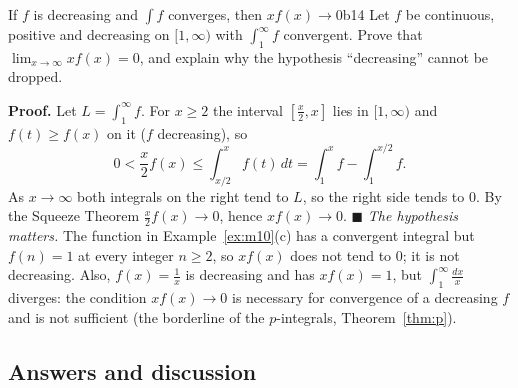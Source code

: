 \documentclass[11pt]{article}
\begin{document}
\begin{exmp}{If $f$ is decreasing and $\int f$ converges, then $xf(x)\to0$}{b14}
Let $f$ be continuous, positive and decreasing on $[1,\infty)$ with $\int_1^\infty f$ convergent. Prove that $\lim_{x\to\infty}xf(x)=0$, and explain why the hypothesis ``decreasing'' cannot be dropped.

\textbf{Proof.} Let $L=\int_1^\infty f$. For $x\ge2$ the interval $\left[\frac x2,x\right]$ lies in $[1,\infty)$ and $f(t)\ge f(x)$ on it ($f$ decreasing), so
\[0<\frac x2f(x)\le\int_{x/2}^xf(t)\,dt=\int_1^xf-\int_1^{x/2}f .\]
As $x\to\infty$ both integrals on the right tend to $L$, so the right side tends to $0$. By the Squeeze Theorem $\frac x2f(x)\to0$, hence $xf(x)\to0$. $\blacksquare$
\emph{The hypothesis matters.} The function in Example~\ref{ex:m10}(c) has a convergent integral but $f(n)=1$ at every integer $n\ge2$, so $xf(x)$ does not tend to $0$; it is not decreasing. Also, $f(x)=\frac1x$ is decreasing and has $xf(x)=1$, but $\int_1^\infty\frac{dx}x$ diverges: the condition $xf(x)\to0$ is necessary for convergence of a decreasing $f$ and is not sufficient (the borderline of the $p$-integrals, Theorem~\ref{thm:p}).
\end{exmp}

\subsection*{Answers and discussion}
\end{document}
